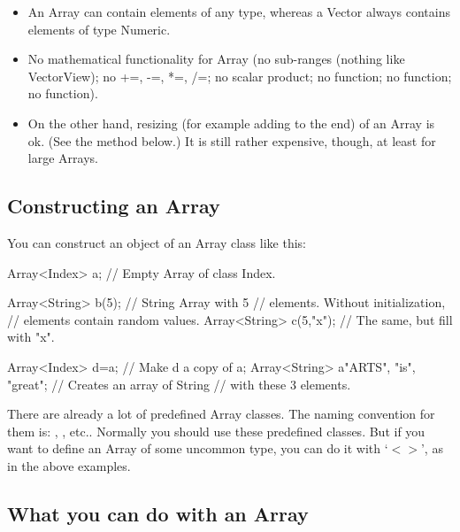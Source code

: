 \begin{itemize}
\item An Array can contain elements of any type, whereas a Vector
  always contains elements of type Numeric.
\item No mathematical functionality for Array (no sub-ranges (nothing
  like VectorView); no +=, -=, *=, /=; no scalar product; no
   function; no  function; no
   function).
\item On the other hand, resizing (for example adding to the end) of
  an Array is ok. (See the  method below.) It is still
  rather expensive, though, at least for large Arrays. 
\end{itemize}

\subsection{Constructing an Array}
You can construct an object of an Array class like this:

\begin{code}
Array<Index>  a;        // Empty Array of class Index.

Array<String> b(5);     // String Array with 5
                        // elements. Without initialization, 
                        // elements contain random values.
Array<String> c(5,"x"); // The same, but fill with "x".

Array<Index>  d=a;      // Make d a copy of a;
Array<String> a{"ARTS",
                "is",
                "great"}; // Creates an array of String
                          // with these 3 elements.
\end{code}

There are already a lot of predefined Array classes. The naming
convention for them is: , ,
etc.. Normally you should use these predefined classes. But if you want
to define an Array of some uncommon type, you can do it with `$<>$',
as in the above examples.

\begin{code}

\end{code}

\subsection{What you can do with an Array}

